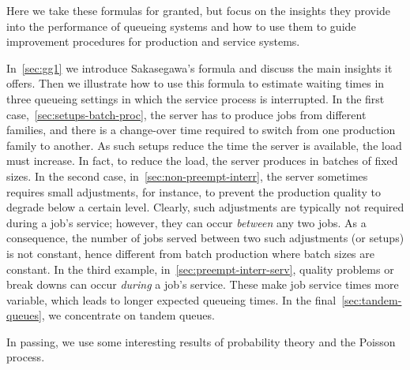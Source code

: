 Here we take these formulas for granted, but focus on the insights they provide into the performance of queueing systems and how to use them to guide improvement procedures for production and service systems.


In~\cref{sec:gg1} we introduce Sakasegawa's formula and discuss the main insights it offers.
Then we illustrate how to use this formula to estimate waiting times in three queueing settings in which the service process is interrupted.
In the first case,~\cref{sec:setups-batch-proc}, the server has to produce jobs from different families, and there is a change-over time required to switch from one production family to another.
As such setups reduce the time the server is available, the load must increase.
In fact, to reduce the load, the server produces in batches of fixed sizes.
In the second case, in~\cref{sec:non-preempt-interr}, the server sometimes requires small adjustments, for instance, to prevent the production quality to degrade below a certain level.
Clearly, such adjustments are typically not required during a job's service; however, they can occur \emph{between} any two jobs.
As a consequence, the number of jobs served between two such adjustments (or setups) is not constant, hence different from batch production where  batch sizes are constant.
In the third example, in~\cref{sec:preempt-interr-serv}, quality problems or break downs can occur \emph{during} a job's service.
These make job service times more variable, which leads to longer expected queueing times.
In the final~\cref{sec:tandem-queues}, we concentrate on tandem queues.

In passing, we use some interesting results of probability theory and the Poisson process.









